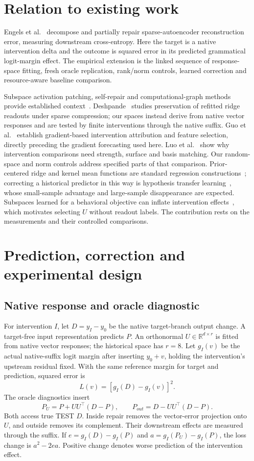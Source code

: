 \documentclass[11pt]{article}
\begin{document}
\section{Relation to existing work}
Engels et al.~\cite{engels2024} decompose and partially repair sparse-autoencoder reconstruction error, measuring downstream cross-entropy. Here the target is a native intervention delta and the outcome is squared error in its predicted grammatical logit-margin effect. The empirical extension is the linked sequence of response-space fitting, fresh oracle replication, rank/norm controls, learned correction and resource-aware baseline comparison.

Subspace activation patching, self-repair and computational-graph methods provide established context~\cite{makelov2023,rushing2024,ameisen2025,farnik2025}. Deshpande~\cite{deshpande2026} studies preservation of refitted ridge readouts under sparse compression; our spaces instead derive from native vector responses and are tested by finite interventions through the native suffix. Guo et al.~\cite{guo2026} establish gradient-based intervention attribution and feature selection, directly preceding the gradient forecasting used here. Luo et al.~\cite{luo2026} show why intervention comparisons need strength, surface and basis matching. Our random-space and norm controls address specified parts of that comparison. Prior-centered ridge and kernel mean functions are standard regression constructions~\cite{rasmussen2006}; correcting a historical predictor in this way is hypothesis transfer learning~\cite{kuzborskij2013}, whose small-sample advantage and large-sample disappearance are expected. Subspaces learned for a behavioral objective can inflate intervention effects~\cite{arxiv261105033}, which motivates selecting $U$ without readout labels. The contribution rests on the measurements and their controlled comparisons.

\section{Prediction, correction and experimental design}
\subsection{Native response and oracle diagnostic}
For intervention $I$, let $D=y_I-y_0$ be the native target-branch output change. A target-free input representation predicts $P$. An orthonormal $U\in\mathbb R^{d\times r}$ is fitted from native vector responses; the historical space has $r=8$. Let $g_I(v)$ be the actual native-suffix logit margin after inserting $y_0+v$, holding the intervention's upstream residual fixed. With the same reference margin for target and prediction, squared error is
\[
 L(v)=[g_I(D)-g_I(v)]^2.
\]
The oracle diagnostics insert
\[
 P_U=P+UU^\top(D-P),\qquad P_{out}=D-UU^\top(D-P).
\]
Both access true TEST $D$. Inside repair removes the vector-error projection onto $U$, and outside removes its complement. Their downstream effects are measured through the suffix. If $e=g_I(D)-g_I(P)$ and $a=g_I(P_U)-g_I(P)$, the loss change is $a^2-2ea$. Positive change denotes worse prediction of the intervention effect.
\end{document}
